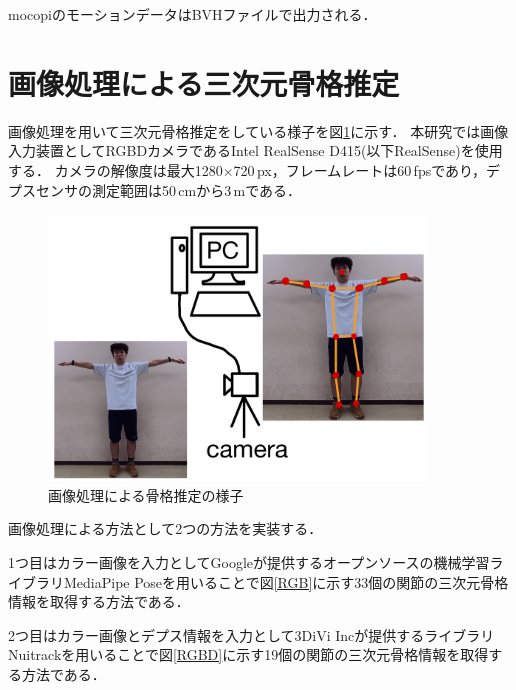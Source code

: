 \documentclass[a4j, fleqn, 12pt]{jsreport}
\begin{document}
mocopiのモーションデータはBVHファイルで出力される．

\section{画像処理による三次元骨格推定}\label{3Dskeleton}
画像処理を用いて三次元骨格推定をしている様子を図\ref{image_3D}に示す．
本研究では画像入力装置としてRGBDカメラであるIntel RealSense D415(以下RealSense)を使用する．
カメラの解像度は最大1280$\times$720\,px，フレームレートは60\,fpsであり，デプスセンサの測定範囲は50\,cmから3\,mである．
\begin{figure}[b]
    \centering
    \includegraphics[width=10cm]{img/image_3D.jpg}
    \caption{画像処理による骨格推定の様子}
    \label{image_3D}
\end{figure}

画像処理による方法として2つの方法を実装する．

1つ目はカラー画像を入力としてGoogleが提供するオープンソースの機械学習ライブラリMediaPipe Poseを用いることで図\ref{RGB}に示す33個の関節の三次元骨格情報を取得する方法である．

2つ目はカラー画像とデプス情報を入力として3DiVi Incが提供するライブラリNuitrackを用いることで図\ref{RGBD}に示す19個の関節の三次元骨格情報を取得する方法である．
\end{document}
